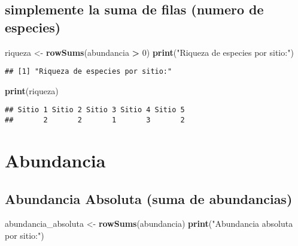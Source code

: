 \documentclass[
]{article}
\newenvironment{Shaded}{\begin{snugshade}}{\end{snugshade}}
\newcommand{\DecValTok}[1]{\textcolor[rgb]{0.00,0.00,0.81}{#1}}
\newcommand{\FunctionTok}[1]{\textcolor[rgb]{0.13,0.29,0.53}{\textbf{#1}}}
\newcommand{\NormalTok}[1]{#1}
\newcommand{\OtherTok}[1]{\textcolor[rgb]{0.56,0.35,0.01}{#1}}
\newcommand{\SpecialCharTok}[1]{\textcolor[rgb]{0.81,0.36,0.00}{\textbf{#1}}}
\newcommand{\StringTok}[1]{\textcolor[rgb]{0.31,0.60,0.02}{#1}}
\begin{document}
\hypertarget{simplemente-la-suma-de-filas-numero-de-especies}{%
\subsection{simplemente la suma de filas (numero de
especies)}\label{simplemente-la-suma-de-filas-numero-de-especies}}

\begin{Shaded}
\begin{Highlighting}[]
\NormalTok{riqueza }\OtherTok{\textless{}{-}} \FunctionTok{rowSums}\NormalTok{(abundancia }\SpecialCharTok{\textgreater{}} \DecValTok{0}\NormalTok{)}
\FunctionTok{print}\NormalTok{(}\StringTok{"Riqueza de especies por sitio:"}\NormalTok{)}
\end{Highlighting}
\end{Shaded}

\begin{verbatim}
## [1] "Riqueza de especies por sitio:"
\end{verbatim}

\begin{Shaded}
\begin{Highlighting}[]
\FunctionTok{print}\NormalTok{(riqueza)}
\end{Highlighting}
\end{Shaded}

\begin{verbatim}
## Sitio 1 Sitio 2 Sitio 3 Sitio 4 Sitio 5 
##       2       2       1       3       2
\end{verbatim}

\hypertarget{abundancia}{%
\section{Abundancia}\label{abundancia}}

\hypertarget{abundancia-absoluta-suma-de-abundancias}{%
\subsection{Abundancia Absoluta (suma de
abundancias)}\label{abundancia-absoluta-suma-de-abundancias}}

\begin{Shaded}
\begin{Highlighting}[]
\NormalTok{abundancia\_absoluta }\OtherTok{\textless{}{-}} \FunctionTok{rowSums}\NormalTok{(abundancia)}
\FunctionTok{print}\NormalTok{(}\StringTok{"Abundancia absoluta por sitio:"}\NormalTok{)}
\end{Highlighting}
\end{Shaded}
\end{document}
